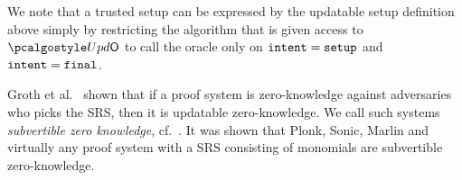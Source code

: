

 We note that a trusted setup can be expressed by the updatable setup definition above simply by restricting the algorithm that is given access to $\initU$ to call the oracle only on $\mathtt{intent} = \mathtt{setup}$ and $\mathtt{intent} = \mathtt{final}$.

Groth et al.~\cite{C:GKMMM18} shown that if a proof system is zero-knowledge against adversaries who picks the SRS, then it is updatable zero-knowledge. We call such systems \emph{subvertible zero knowledge}, cf.~\cite{AC:BelFucSca16,AC:ABLZ17}. It was shown that Plonk, Sonic, Marlin and virtually any proof system with a SRS consisting of monomials are subvertible zero-knowledge.

